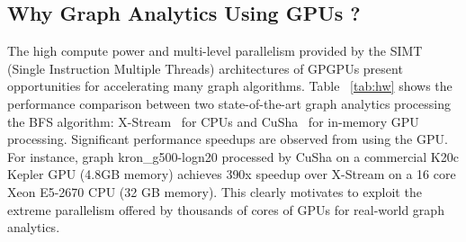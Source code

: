 \subsection{Why Graph Analytics Using GPUs ?}
The high compute power and multi-level parallelism provided by the SIMT (Single Instruction Multiple Threads) architectures of GPGPUs present opportunities for accelerating many graph algorithms. Table ~\ref{tab:hw} shows the performance comparison between two state-of-the-art graph analytics processing the BFS algorithm: X-Stream~\cite{xstream} for CPUs and CuSha~\cite{cusha} for in-memory GPU processing. Significant performance speedups are observed from using the GPU. For instance, graph kron\_g500-logn20 processed by CuSha on a commercial K20c Kepler GPU (4.8GB memory) achieves 390x speedup over X-Stream on a 16 core Xeon E5-2670 CPU (32 GB memory). This clearly motivates to exploit the extreme parallelism offered by thousands of cores of GPUs for real-world graph analytics. 
